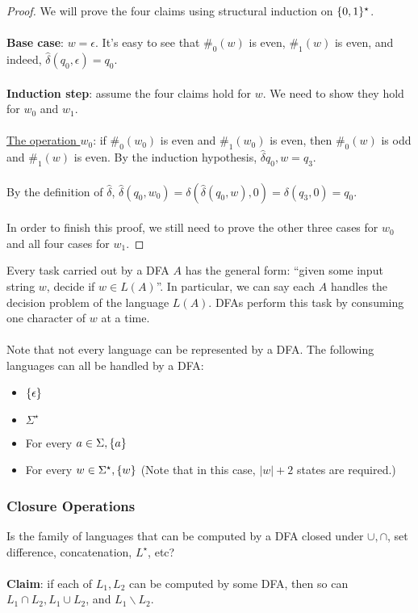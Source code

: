 \documentclass[]{article}
\DeclarePairedDelimiter{\set}{\lbrace}{\rbrace}
\theoremstyle{definition}
\begin{document}
      \begin{proof}
        We will prove the four claims using structural induction on $\set{0, 1}^\star$.
        \\ \\
        \textbf{Base case}: $w = \epsilon$. It's easy to see that $\#_0(w)$ is even, $\#_1(w)$ is even, and indeed, $\hat{\delta}(q_0, \epsilon) = q_0$.
        \\ \\
        \textbf{Induction step}: assume the four claims hold for $w$. We need to show they hold for $w_0$ and $w_1$.
        \\ \\
        \underline{The operation $w_0$}: if $\#_0(w_0)$ is even and $\#_1(w_0)$ is even, then $\#_0(w)$ is odd and $\#_1(w)$ is even. By the induction hypothesis, $\hat{\delta}{q_0, w} = q_3$.
        \\ \\
        By the definition of $\hat{\delta}$, $\hat{\delta}(q_0, w_0) = \delta( \hat{\delta}(q_0, w), 0) = \delta(q_3, 0) = q_0$.
        \\ \\
        In order to finish this proof, we still need to prove the other three cases for $w_0$ and all four cases for $w_1$.
      \end{proof}

      Every task carried out by a DFA $A$ has the general form: ``given some input string $w$, decide if $w \in L(A)$''. In particular, we can say each $A$ handles the decision problem of the language $L(A)$. DFAs perform this task by consuming one character of $w$ at a time.
      \\ \\
      Note that not every language can be represented by a DFA. The following languages can all be handled by a DFA:
      \begin{itemize}
        \item $\set{ \epsilon }$
        \item $\Sigma^\star$
        \item For every $a \in \Sigma, \set{a}$
        \item For every $w \in \Sigma^\star, \set{w}$ (Note that in this case, $|w| + 2$ states are required.)
      \end{itemize}

      \subsubsection{Closure Operations}
        Is the family of languages that can be computed by a DFA closed under $\cup, \cap$, set difference, concatenation, $L^\star$, etc?
        \\ \\
        \textbf{Claim}: if each of $L_1, L_2$ can be computed by some DFA, then so can $L_1 \cap L_2, L_1 \cup L_2$, and $L_1 \backslash L_2$.
\end{document}
